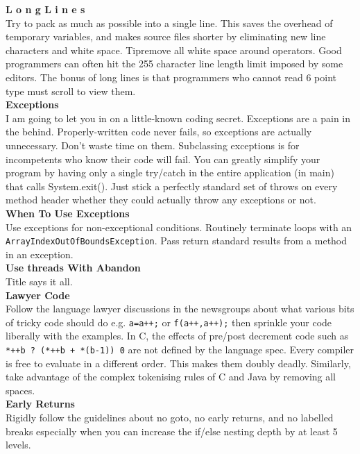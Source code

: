 \documentclass[11pt,twoside,a4paper]{article}
\begin{document}
\textbf{L o n g   L i n e s}~\\
Try to pack as much as possible into a single line. This saves the overhead of temporary variables, and makes source files shorter by eliminating new line characters and white space. Tipremove all white space around operators. Good programmers can often hit the 255 character line length limit imposed by some editors. The bonus of long lines is that programmers who cannot read 6 point type must scroll to view them.~\\ 

\textbf{Exceptions}~\\
I am going to let you in on a little-known coding secret. Exceptions are a pain in the behind. Properly-written code never fails, so exceptions are actually unnecessary. Don't waste time on them. Subclassing exceptions is for incompetents who know their code will fail. You can greatly simplify your program by having only a single try/catch in the entire application (in main) that calls System.exit(). Just stick a perfectly standard set of throws on every method header whether they could actually throw any exceptions or not. ~\\

\textbf{When To Use Exceptions}~\\
Use exceptions for non-exceptional conditions. Routinely terminate loops with an \texttt{ArrayIndexOutOfBoundsException}. Pass return standard results from a method in an exception. ~\\

\textbf{Use threads With Abandon}~\\
Title says it all. ~\\

\textbf{Lawyer Code}~\\
Follow the language lawyer discussions in the newsgroups about what various bits of tricky code should do e.g. \texttt{a=a++;} or \texttt{f(a++,a++);} then sprinkle your code liberally with the examples. In C, the effects of pre/post decrement code such as \texttt{*++b ? (*++b + *(b-1)) 0} are not defined by the language spec. Every compiler is free to evaluate in a different order. This makes them doubly deadly. Similarly, take advantage of the complex tokenising rules of C and Java by removing all spaces.~\\ 

\textbf{Early Returns}~\\
Rigidly follow the guidelines about no goto, no early returns, and no labelled breaks especially when you can increase the if/else nesting depth by at least 5 levels. ~\\
\end{document}
